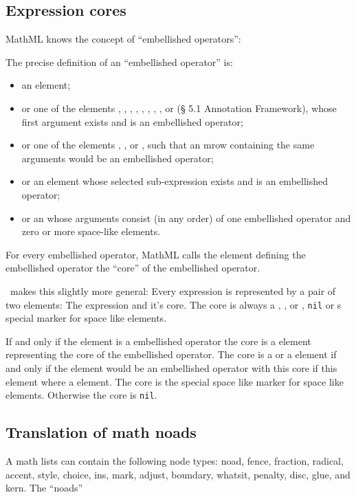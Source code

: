 \subsection{Expression cores}
MathML knows the concept of \enquote{embellished operators}:
\begin{blockquote}
  The precise definition of an \enquote{embellished operator} is:
  \begin{itemize}
    \item an  element;
    \item or one of the elements , , , , , , , , or  (§ 5.1 Annotation Framework), whose first argument exists and is an embellished operator;
    \item or one of the elements , , or , such that an mrow containing the same arguments would be an embellished operator;
    \item or an  element whose selected sub-expression exists and is an embellished operator;
    \item or an  whose arguments consist (in any order) of one embellished operator and zero or more space-like elements.
  \end{itemize}
\end{blockquote}
For every embellished operator, MathML calls the  element defining the embellished operator the \enquote{core} of the embellished operator.

\Luamml\ makes this slightly more general: Every expression is represented by a pair of two elements: The expression and it's core.
The core is always a , , or , \texttt{nil} or s special marker for space like elements.

If and only if the element is a embellished operator the core is a  element representing the core of the embellished operator.
The core is a  or a  element if and only if the element would be an embellished operator with this core if this element where a  element.
The core is the special space like marker for space like elements. Otherwise the core is \texttt{nil}.

\subsection{Translation of math noads}
A math lists can contain the following node types: noad, fence, fraction, radical, accent, style, choice, ins, mark, adjust, boundary, whatsit, penalty, disc, glue, and kern. The \enquote{noads}

